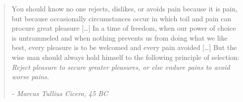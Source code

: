 \documentclass[../main.tex]{subfiles}
\begin{document}
\begin{quote}
	You should know no one rejects, dislikes, or avoids pain because it is pain, but because occasionally circumstances occur in which toil and pain can procure great pleasure
	[\ldots]
	In a time of freedom, when our power of choice is untrammeled and when nothing prevents us from doing what we like best, every pleasure is to be welcomed and every pain avoided [\ldots]
	But the wise man should always hold himself to the following principle of selection: \textit{Reject pleasure to secure greater pleasures, or else endure pains to avoid worse pains.}
	\begin{flushright}
		\textit{- Marcus Tullius Cicero, 45 BC}
	\end{flushright}
\end{quote}



	
\vfill
\newpage %
\thispagestyle{empty}
\mbox{}

	
\end{document}
